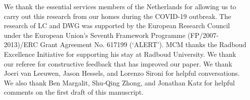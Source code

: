 We thank the essential services members of the Netherlands 
for allowing us to carry out this research from our homes during 
the COVID-19 outbreak.
The research of LC and DWG was supported by 
the European Research Council under the European Union's Seventh Framework Programme
(FP/2007-2013)/ERC Grant Agreement No. 617199 (`ALERT').
MCM thanks the Radboud Excellence Initiative for supporting his stay at Radboud University. We thank our referee for constructive feedback 
that has improved our paper.
We thank Joeri van Leeuwen, Jason Hessels, and Lorenzo Sironi
for helpful conversations. We also 
thank Ben Margalit, Shu-Qing Zhong, and Jonathan Katz for 
helpful comments on the first draft of this manuscript.

